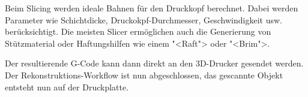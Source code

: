 Beim Slicing werden ideale Bahnen für den Druckkopf berechnet. Dabei werden
Parameter wie Schichtdicke, Druckokpf-Durchmesser, Geschwindigkeit usw.
berücksichtigt. Die meisten Slicer ermöglichen auch die Generierung von
Stützmaterial oder Haftungshilfen wie einem "<Raft"> oder "<Brim">.

Der resultierende G-Code kann dann direkt an den 3D-Drucker gesendet werden. Der
Rekonstruktions-Workflow ist nun abgeschlossen, das gescannte Objekt entsteht
nun auf der Druckplatte.

